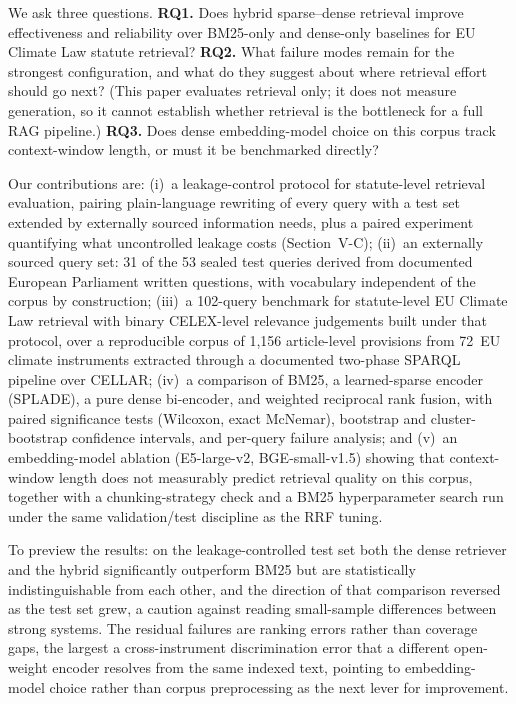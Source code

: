 \documentclass[conference,a4paper]{IEEEtran}
\begin{document}
We ask three questions.
\textbf{RQ1.} Does hybrid sparse--dense retrieval improve
effectiveness and reliability over BM25-only and dense-only baselines
for EU Climate Law statute retrieval?
\textbf{RQ2.} What failure modes remain for the strongest
configuration, and what do they suggest about where retrieval effort
should go next? (This paper evaluates retrieval only; it does not
measure generation, so it cannot establish whether retrieval is the
bottleneck for a full RAG pipeline.)
\textbf{RQ3.} Does dense embedding-model choice on this corpus track
context-window length, or must it be benchmarked directly?

Our contributions are:
(i)~a leakage-control protocol for statute-level retrieval
evaluation, pairing plain-language rewriting of every query with a
test set extended by externally sourced information needs, plus a
paired experiment quantifying what uncontrolled leakage costs
(Section~V-C);
(ii)~an externally sourced query set: 31 of the 53 sealed test
queries derived from documented European Parliament written
questions, with vocabulary independent of the corpus by construction;
(iii)~a 102-query benchmark for statute-level EU Climate Law
retrieval with binary CELEX-level relevance judgements built under
that protocol, over a reproducible corpus of 1{,}156 article-level
provisions from 72~EU climate instruments extracted through a
documented two-phase SPARQL pipeline over CELLAR;
(iv)~a comparison of BM25, a learned-sparse encoder (SPLADE), a pure
dense bi-encoder, and weighted reciprocal rank fusion, with paired
significance tests (Wilcoxon, exact McNemar), bootstrap and
cluster-bootstrap confidence intervals, and per-query failure
analysis; and
(v)~an embedding-model ablation (E5-large-v2, BGE-small-v1.5) showing
that context-window length does not measurably predict retrieval
quality on this corpus, together with a chunking-strategy check and a
BM25 hyperparameter search run under the same validation/test
discipline as the RRF tuning.

To preview the results: on the leakage-controlled test set both the
dense retriever and the hybrid significantly outperform BM25 but are
statistically indistinguishable from each other, and the direction of
that comparison reversed as the test set grew, a caution against
reading small-sample differences between strong systems.
The residual failures are ranking errors rather than coverage gaps,
the largest a cross-instrument discrimination error that a different
open-weight encoder resolves from the same indexed text, pointing to
embedding-model choice rather than corpus preprocessing as the next
lever for improvement.
\end{document}
